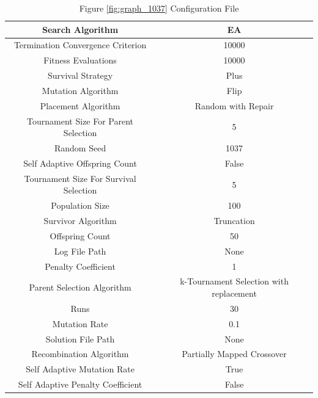 \documentclass{standalone}
\begin{document}
\begin{table}[!htb]
	\centering
	\caption{Figure \ref{fig:graph_1037} Configuration File}
	\label{tab:graph_1037}
	\begin{tabular}{| c | c |}
		\hline
		Search Algorithm		& EA		 \\
		\hline
		Termination Convergence Criterion		& 10000		 \\
		\hline
		Fitness Evaluations		& 10000		 \\
		\hline
		Survival Strategy		& Plus		 \\
		\hline
		Mutation Algorithm		& Flip		 \\
		\hline
		Placement Algorithm		& Random with Repair		 \\
		\hline
		Tournament Size For Parent Selection		& 5		 \\
		\hline
		Random Seed		& 1037		 \\
		\hline
		Self Adaptive Offspring Count		& False		 \\
		\hline
		Tournament Size For Survival Selection		& 5		 \\
		\hline
		Population Size		& 100		 \\
		\hline
		Survivor Algorithm		& Truncation		 \\
		\hline
		Offspring Count		& 50		 \\
		\hline
		Log File Path		& None		 \\
		\hline
		Penalty Coefficient		& 1		 \\
		\hline
		Parent Selection Algorithm		& k-Tournament Selection with replacement		 \\
		\hline
		Runs		& 30		 \\
		\hline
		Mutation Rate		& 0.1		 \\
		\hline
		Solution File Path		& None		 \\
		\hline
		Recombination Algorithm		& Partially Mapped Crossover		 \\
		\hline
		Self Adaptive Mutation Rate		& True		 \\
		\hline
		Self Adaptive Penalty Coefficient		& False		 \\
		\hline
	\end{tabular}
\end{table}
\end{document}
